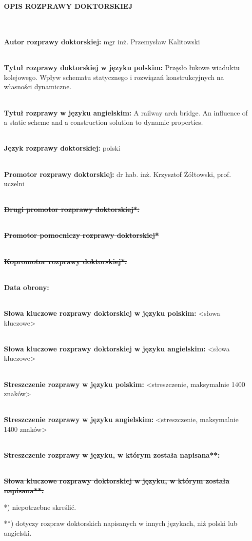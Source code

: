 \begin{myfont}
	
	\noindent
	\\ \\	
	\textbf{OPIS ROZPRAWY DOKTORSKIEJ}
	
\footnotesize \noindent
	\\ \\
\textbf{Autor rozprawy doktorskiej:} mgr inż. Przemysław Kalitowski

 \noindent
\\
\textbf{Tytuł rozprawy doktorskiej w języku polskim:} Przęsło łukowe wiaduktu kolejowego. Wpływ schematu statycznego i rozwiązań konstrukcyjnych na własności dynamiczne.

 \noindent
\\
\textbf{Tytuł rozprawy w języku angielskim:} A railway arch bridge. An influence of a static scheme and a construction solution to dynamic properties.

 \noindent
\\
\textbf{Język rozprawy doktorskiej:} polski

 \noindent
\\
\textbf{Promotor rozprawy doktorskiej:} dr hab. inż. Krzysztof Żółtowski, prof. uczelni

 \noindent
\\
{\bfseries \sout{Drugi promotor rozprawy doktorskiej*:}}

 \noindent
\\
{\bfseries \sout{Promotor pomocniczy rozprawy doktorskiej*}}

 \noindent
\\
{\bfseries \sout{Kopromotor rozprawy doktorskiej*:}}

 \noindent
\\
\textbf{Data obrony:}

 \noindent
\\
\textbf{Słowa kluczowe rozprawy doktorskiej w języku polskim:} <słowa kluczowe>

 \noindent
\\
\textbf{Słowa kluczowe rozprawy doktorskiej w języku angielskim:} <słowa kluczowe>

\noindent
\\
\textbf{Streszczenie rozprawy w języku polskim:} <streszczenie, maksymalnie 1400 znaków>

\noindent
\\
\textbf{Streszczenie rozprawy w języku angielskim:} <streszczenie, maksymalnie 1400 znaków>

\noindent
\\
{\bfseries \sout{Streszczenie rozprawy w języku, w którym została napisana**:}}

\noindent
\\
{\bfseries \sout{Słowa kluczowe rozprawy doktorskiej w języku, w którym została napisana**:}}
\bigskip

*) niepotrzebne skreślić.

**) dotyczy rozpraw doktorskich napisanych w innych językach, niż polski lub angielski.
\vfill
\end{myfont}

